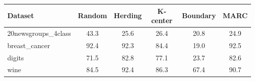 \begin{tabular}{lccccc}
\toprule
Dataset & Random & Herding & K-center & Boundary & MARC \\
\midrule
20newsgroups\_4class & 43.3 & 25.6 & 26.4 & 20.8 & 24.9 \\
breast\_cancer & 92.4 & 92.3 & 84.4 & 19.0 & 92.5 \\
digits & 71.5 & 82.8 & 77.1 & 23.7 & 82.6 \\
wine & 84.5 & 92.4 & 86.3 & 67.4 & 90.7 \\
\bottomrule
\end{tabular}
